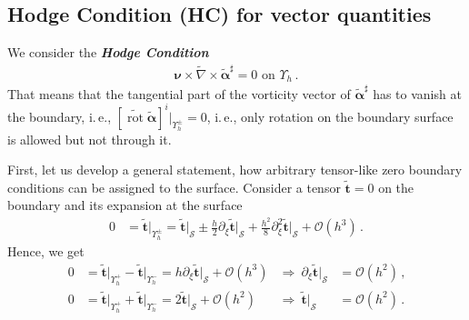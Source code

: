 \documentclass[a4paper,10pt]{scrartcl}
\newcommand{\surf}{\mathcal{S}}
\newcommand{\landau}{\mathcal{O}}
\newcommand{\nub}{\bm{\nu}}
\newcommand{\tb}{\mathbf{t}}
\newcommand{\alphab}{\bm{\alpha}}
\newcommand{\ttb}{\tilde{\tb}}
\newcommand{\talphab}{\tilde{\alphab}}
\newcommand{\tnabla}{\tilde{\nabla}}
\newcommand{\boundary}[1]{\Upsilon_{h}^{#1}}
\newcommand{\AtBoundary}[1]{\big|_{\boundary{#1}}}
\newcommand{\AtSurface}{\big|_{\surf}}
\newcommand{\formComma}{\,\text{,}}
\newcommand{\formPeriod}{\,\text{.}}
\newcommand{\ie}{i.\,e.}%
\newcommand{\newterm}[1]{\textbf{\textit{#1}}}
\begin{document}
  
  \subsection{Hodge Condition (HC) for vector quantities}
    We consider the \newterm{Hodge Condition}
    \begin{align}
      \nub \times \tnabla \times \talphab^{\sharp}= 0 \text{ on }\boundary{} \formPeriod
      \tag{HC}
    \end{align}
    That means that the tangential part of the vorticity vector of \( \talphab^{\sharp} \) has to vanish at the boundary, \ie, 
    \( \left[ \widetilde{\operatorname{rot}}\talphab \right]^{i}\AtBoundary{\pm} = 0 \), \ie,
    only rotation on the boundary surface is allowed but not through it.

    First, let us develop a general statement, how arbitrary tensor-like zero boundary conditions can be assigned to the surface.
    Consider a tensor \( \ttb = 0 \) on the boundary and its expansion at the surface
    \begin{align}
      0 &= \ttb\AtBoundary{\pm} = \ttb\AtSurface \pm \frac{h}{2}\partial_{\xi}\ttb\AtSurface + \frac{h^{2}}{8}\partial_{\xi}^{2}\ttb\AtSurface + \landau(h^{3})\formPeriod
    \end{align}
    Hence, we get
    \begin{align}
      0 &= \ttb\AtBoundary{+} - \ttb\AtBoundary{-} = h\partial_{\xi}\ttb\AtSurface + \landau(h^{3})
          &\Rightarrow\ \partial_{\xi}\ttb\AtSurface &= \landau(h^{2}) \formComma\\
      0 &= \ttb\AtBoundary{+} + \ttb\AtBoundary{-} = 2\ttb\AtSurface + \landau(h^{2})
          &\Rightarrow\ \ttb\AtSurface &= \landau(h^{2}) \formPeriod
    \end{align}
\end{document}
